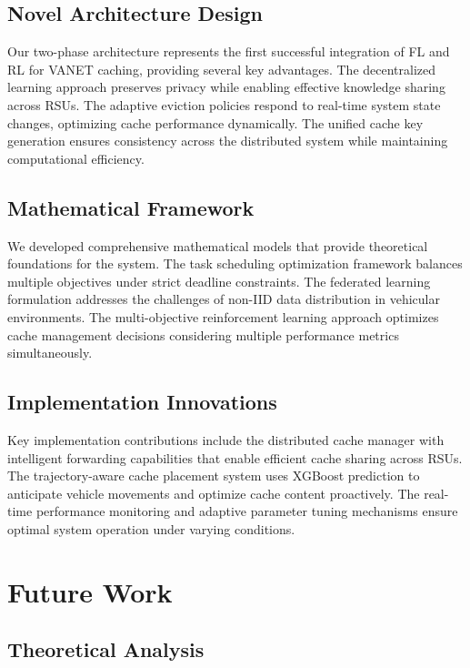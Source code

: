 \documentclass[11pt]{article}
\begin{document}
\subsection{Novel Architecture Design}

Our two-phase architecture represents the first successful integration of FL and RL for VANET caching, providing several key advantages. The decentralized learning approach preserves privacy while enabling effective knowledge sharing across RSUs. The adaptive eviction policies respond to real-time system state changes, optimizing cache performance dynamically. The unified cache key generation ensures consistency across the distributed system while maintaining computational efficiency.

\subsection{Mathematical Framework}

We developed comprehensive mathematical models that provide theoretical foundations for the system. The task scheduling optimization framework balances multiple objectives under strict deadline constraints. The federated learning formulation addresses the challenges of non-IID data distribution in vehicular environments. The multi-objective reinforcement learning approach optimizes cache management decisions considering multiple performance metrics simultaneously.

\subsection{Implementation Innovations}

Key implementation contributions include the distributed cache manager with intelligent forwarding capabilities that enable efficient cache sharing across RSUs. The trajectory-aware cache placement system uses XGBoost prediction to anticipate vehicle movements and optimize cache content proactively. The real-time performance monitoring and adaptive parameter tuning mechanisms ensure optimal system operation under varying conditions.

\section{Future Work}

\subsection{Theoretical Analysis}
\end{document}
